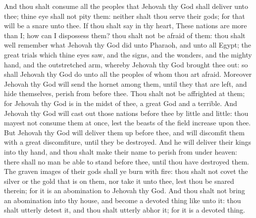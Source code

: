 And thou shalt consume all the peoples that Jehovah thy God shall deliver unto thee; thine eye shall not pity them: neither shalt thou serve their gods; for that will be a snare unto thee.  If thou shalt say in thy heart, These nations are more than I; how can I dispossess them? thou shalt not be afraid of them: thou shalt well remember what Jehovah thy God did unto Pharaoh, and unto all Egypt; the great trials which thine eyes saw, and the signs, and the wonders, and the mighty hand, and the outstretched arm, whereby Jehovah thy God brought thee out: so shall Jehovah thy God do unto all the peoples of whom thou art afraid. Moreover Jehovah thy God will send the hornet among them, until they that are left, and hide themselves, perish from before thee. Thou shalt not be affrighted at them; for Jehovah thy God is in the midst of thee, a great God and a terrible. And Jehovah thy God will cast out those nations before thee by little and little: thou mayest not consume them at once, lest the beasts of the field increase upon thee. But Jehovah thy God will deliver them up before thee, and will discomfit them with a great discomfiture, until they be destroyed. And he will deliver their kings into thy hand, and thou shalt make their name to perish from under heaven: there shall no man be able to stand before thee, until thou have destroyed them. The graven images of their gods shall ye burn with fire: thou shalt not covet the silver or the gold that is on them, nor take it unto thee, lest thou be snared therein; for it is an abomination to Jehovah thy God. And thou shalt not bring an abomination into thy house, and become a devoted thing like unto it: thou shalt utterly detest it, and thou shalt utterly abhor it; for it is a devoted thing. 

